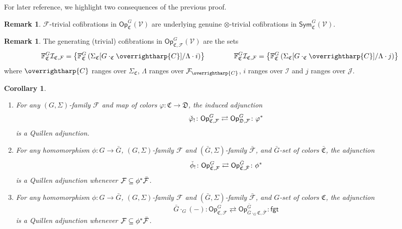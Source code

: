 \documentclass[a4paper,10pt
,draft
]{article}%
\numberwithin{equation}{section}
\numberwithin{figure}{section}
\newtheorem{corollary}[equation]{Corollary}%
\theoremstyle{definition} %
\newtheorem{remark}[equation]{Remark}%
\newcommand{\vect}[1]{\text{\overrightharp{\ensuremath{#1}}}}
\newcommand{\Op}{\mathsf{Op}}%
\newcommand{\F}{\ensuremath{\mathcal F}}
\newcommand{\V}{\ensuremath{\mathcal V}}
\newcommand{\1}{\ensuremath{\mathbbm 1}}%
\begin{document}
For later reference, 
we highlight two consequences of the previous proof.


\begin{remark}\label{GOTC_REM}
$\F$-trivial cofibrations in $\Op^G_{\mathfrak C}(\V)$ are underlying genuine $\otimes$-trivial cofibrations
in $\mathsf{Sym}^G_{\mathfrak C}(\V)$.
\end{remark}

\begin{remark}
The generating (trivial) cofibrations in
$\mathsf{Op}^G_{\mathfrak{C},\F}(\V)$
are the sets
\begin{equation}\label{FVGSIGF EQ}
	\mathbb{F}^G_{\mathfrak{C}}\mathcal{I}_{\mathfrak{C},\mathcal{F}}
=
	\left\{
	\mathbb{F}^G_{\mathfrak{C}}
	\left(\Sigma_{\mathfrak{C}}[G \cdot_{\mathfrak{C}} \vect{C}]/\Lambda \cdot i \right)
	\right\}
\qquad \qquad
	\mathbb{F}^G_{\mathfrak{C}}\mathcal{I}_{\mathfrak{C},\mathcal{F}}
=
	\left\{
	\mathbb{F}^G_{\mathfrak{C}}
	\left(\Sigma_{\mathfrak{C}}[G \cdot_{\mathfrak{C}} \vect{C}]/\Lambda \cdot j \right)
	\right\}
\end{equation}
where $\vect{C}$ ranges over $\Sigma_{\mathfrak{C}}$,
$\Lambda$ ranges over $\F_{\vect{C}}$,
$i$ ranges over $\mathcal{I}$ and
$j$ ranges over $\mathcal{J}$.
\end{remark}



\begin{corollary}\label{OPADJ_COR}
\begin{enumerate}[label=(\roman*)]
\item \label{OPCOCHADJ_LBL}
	For any $(G,\Sigma)$-family $\F$ and map of colors 
	$\varphi \colon \mathfrak C \to \mathfrak D$, the induced adjunction
		\[
		\check{\varphi}_! \colon \mathsf{Op}^G_{\mathfrak{C},\F}
			\rightleftarrows
		\mathsf{Op}^G_{\mathfrak{D},\F} \colon \varphi^{\**}
		\]
	is a Quillen adjunction.
\item \label{OPFIXSETCHGR_LBL}
	For any homomorphism $\phi \colon G \to \bar G$,
	$(G,\Sigma)$-family $\F$ and $(\bar G,\Sigma)$-family $\bar{\F}$,
	and $\bar G$-set of colors $\bar{\mathfrak C}$,
	the adjunction
		\[
		\check{\phi}_! \colon \mathsf{Op}^G_{\bar{\mathfrak{C}},\F}
			\rightleftarrows
		\mathsf{Op}^{\bar{G}}_{\bar{\mathfrak{C}},\bar{\F}} \colon \phi^{\**}
		\]
	is a Quillen adjunction whenever $\F \subseteq \phi^{\**} \bar{\F}$.
\item \label{OPCOMBADJ_LBL}
	For any homomorphism $\phi \colon G \to \bar G$,
	$(G,\Sigma)$-family $\F$ and $(\bar G,\Sigma)$-family $\bar{\F}$,
	and $G$-set of colors $\mathfrak C$,
	the adjunction
            \[
                  \bar{G} \cdot_G (-) \colon \mathsf{Op}^G_{\mathfrak{C},\F}
                  \rightleftarrows
                  \mathsf{Op}^{\bar{G}}_{\bar{G} \cdot_G \mathfrak{C},\bar{\F}} \colon \mathsf{fgt}
            \]
	is a Quillen adjunction whenever $\F \subseteq \phi^{\**} \bar{\F}$.
      \end{enumerate}
\end{corollary}
\end{document}
